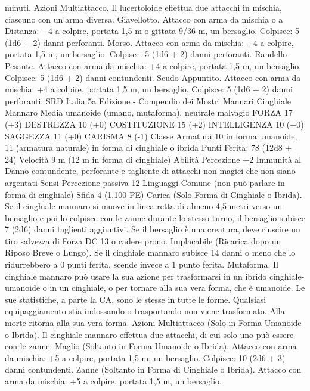 \begin{multicols}{2}
minuti.
Azioni
Multiattacco. Il lucertoloide effettua due attacchi in mischia,
ciascuno con un’arma diversa.
Giavellotto. Attacco con arma da mischia o a Distanza: +4 a
colpire, portata 1,5 m o gittata 9/36 m, un bersaglio.
Colpisce: 5 (1d6 + 2) danni perforanti.
Morso. Attacco con arma da mischia: +4 a colpire, portata 1,5
m, un bersaglio.
Colpisce: 5 (1d6 + 2) danni perforanti.
Randello Pesante. Attacco con arma da mischia: +4 a colpire,
portata 1,5 m, un bersaglio.
Colpisce: 5 (1d6 + 2) danni contundenti.
Scudo Appuntito. Attacco con arma da mischia: +4 a colpire,
portata 1,5 m, un bersaglio.
Colpisce: 5 (1d6 + 2) danni perforanti.
SRD Italia 5a Edizione - Compendio dei Mostri
Mannari
Cinghiale Mannaro
Media umanoide (umano, mutaforma), neutrale malvagio
FORZA 17 (+3)
DESTREZZA 10 (+0)
COSTITUZIONE 15 (+2)
INTELLIGENZA 10 (+0)
SAGGEZZA 11 (+0)
CARISMA 8 (-1)
Classe Armatura 10 in forma umanoide, 11 (armatura naturale)
in forma di cinghiale o ibrida
\hspace*{0pt}\hfill{Punti Ferita}: 78 (12d8 + 24)
Velocità 9 m (12 m in forma di cinghiale)
Abilità Percezione +2
Immunità al Danno contundente, perforante e tagliente di
attacchi non magici che non siano argentati
Sensi Percezione passiva 12
Linguaggi Comune (non può parlare in forma di cinghiale)
Sfida 4 (1.100 PE)
Carica (Solo Forma di Cinghiale o Ibrida). Se il cinghiale
mannaro si muove in linea retta di almeno 4,5 metri verso un
bersaglio e poi lo colpisce con le zanne durante lo stesso turno, il
bersaglio subisce 7 (2d6) danni taglienti aggiuntivi. Se il
bersaglio è una creatura, deve riuscire un tiro salvezza di Forza
DC 13 o cadere prono.
Implacabile (Ricarica dopo un Riposo Breve o Lungo). Se il
cinghiale mannaro subisce 14 danni o meno che lo ridurrebbero a
0 punti ferita, scende invece a 1 punto ferita.
Mutaforma. Il cinghiale mannaro può usare la sua azione per
trasformarsi in un ibrido cinghiale-umanoide o in un cinghiale, o
per tornare alla sua vera forma, che è umanoide. Le sue
statistiche, a parte la CA, sono le stesse in tutte le forme.
Qualsiasi equipaggiamento stia indossando o trasportando non
viene trasformato. Alla morte ritorna alla sua vera forma.
Azioni
Multiattacco (Solo in Forma Umanoide o Ibrida). Il cinghiale
mannaro effettua due attacchi, di cui solo uno può essere con le
zanne.
Maglio (Soltanto in Forma Umanoide o Ibrida). Attacco con
arma da mischia: +5 a colpire, portata 1,5 m, un bersaglio.
Colpisce: 10 (2d6 + 3) danni contundenti.
Zanne (Soltanto in Forma di Cinghiale o Ibrida). Attacco con
arma da mischia: +5 a colpire, portata 1,5 m, un bersaglio.

\end{multicols}
